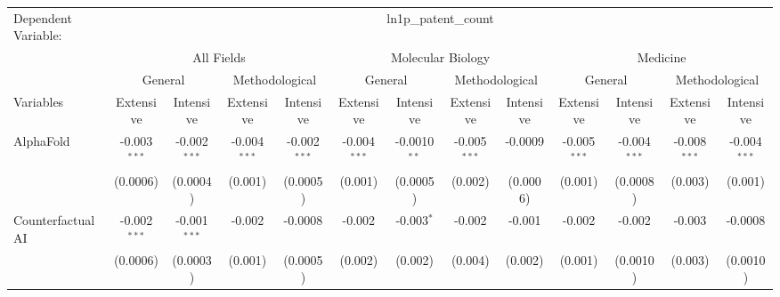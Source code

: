 \begingroup
\centering
\begin{tabular}{lcccccccccccc}
   \tabularnewline \midrule \midrule
   Dependent Variable: & \multicolumn{12}{c}{ln1p\_patent\_count}\\
 & \multicolumn{4}{c}{All Fields} & \multicolumn{4}{c}{Molecular Biology} & \multicolumn{4}{c}{Medicine} \\
\cmidrule(lr){2-5} \cmidrule(lr){6-9} \cmidrule(lr){10-13}
 & \multicolumn{2}{c}{General} & \multicolumn{2}{c}{Methodological} & \multicolumn{2}{c}{General} & \multicolumn{2}{c}{Methodological} & \multicolumn{2}{c}{General} & \multicolumn{2}{c}{Methodological} \\
\cmidrule(lr){2-3} \cmidrule(lr){4-5} \cmidrule(lr){6-7} \cmidrule(lr){8-9} \cmidrule(lr){10-11} \cmidrule(lr){12-13}
Variables & \multicolumn{1}{c}{Extensive} & \multicolumn{1}{c}{Intensive} & \multicolumn{1}{c}{Extensive} & \multicolumn{1}{c}{Intensive} & \multicolumn{1}{c}{Extensive} & \multicolumn{1}{c}{Intensive} & \multicolumn{1}{c}{Extensive} & \multicolumn{1}{c}{Intensive} & \multicolumn{1}{c}{Extensive} & \multicolumn{1}{c}{Intensive} & \multicolumn{1}{c}{Extensive} & \multicolumn{1}{c}{Intensive} \\
\cmidrule(lr){1-1}\cmidrule(lr){2-2} \cmidrule(lr){3-3} \cmidrule(lr){4-4} \cmidrule(lr){5-5} \cmidrule(lr){6-6} \cmidrule(lr){7-7} \cmidrule(lr){8-8} \cmidrule(lr){9-9} \cmidrule(lr){10-10} \cmidrule(lr){11-11} \cmidrule(lr){12-12} \cmidrule(lr){13-13}
   AlphaFold                                & -0.003$^{***}$ & -0.002$^{***}$ & -0.004$^{***}$ & -0.002$^{***}$ & -0.004$^{***}$ & -0.0010$^{**}$  & -0.005$^{***}$ & -0.0009        & -0.005$^{***}$ & -0.004$^{***}$ & -0.008$^{***}$ & -0.004$^{***}$\\   
                                            & (0.0006)       & (0.0004)       & (0.001)        & (0.0005)       & (0.001)        & (0.0005)        & (0.002)        & (0.0006)       & (0.001)        & (0.0008)       & (0.003)        & (0.001)\\   
   Counterfactual AI                        & -0.002$^{***}$ & -0.001$^{***}$ & -0.002         & -0.0008        & -0.002         & -0.003$^{*}$    & -0.002         & -0.001         & -0.002         & -0.002         & -0.003         & -0.0008\\   
                                            & (0.0006)       & (0.0003)       & (0.001)        & (0.0005)       & (0.002)        & (0.002)         & (0.004)        & (0.002)        & (0.001)        & (0.0010)       & (0.003)        & (0.0010)\\   

\end{tabular}
